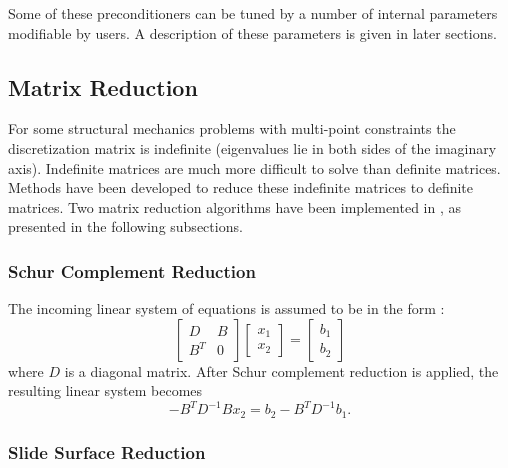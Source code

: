 Some of these preconditioners can be tuned by a number of internal parameters
modifiable by users. A description of these parameters is given in later
sections.

\subsection{Matrix Reduction} 

For some structural mechanics problems with multi-point constraints the 
discretization matrix is indefinite (eigenvalues lie in both sides of
the imaginary axis). Indefinite matrices are much more difficult to solve
than definite matrices. Methods have been developed to reduce these
indefinite matrices to definite matrices.  Two matrix reduction algorithms
have been implemented in \hypre{}, as presented in the following subsections.

\subsubsection{Schur Complement Reduction}

The incoming linear system of equations is assumed to be in the form :
\[ \left[ 
\begin{array}{cc} 
   D   & B \\
   B^T & 0
\end{array}
  \right] 
  \left[
\begin{array}{c} 
   x_1 \\
   x_2
\end{array}
  \right] 
  =
  \left[
\begin{array}{c} 
   b_1 \\
   b_2
\end{array}
  \right] 
\]
where $D$ is a diagonal matrix.  After Schur complement reduction is applied, 
the resulting linear system becomes
$$
- B^T D^{-1} B x_2 = b_2 - B^T D^{-1} b_1.
$$

\subsubsection{Slide Surface Reduction}

